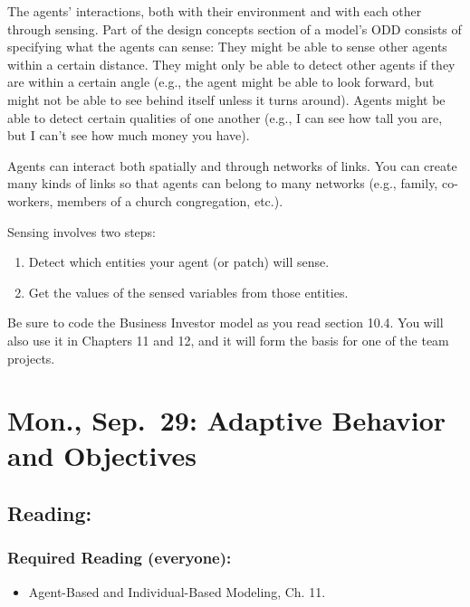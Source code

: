\documentclass[
]{article}
\providecommand{\tightlist}{%
  \setlength{\itemsep}{0pt}\setlength{\parskip}{0pt}}
\begin{document}
The agents' interactions, both with their environment and with each
other through sensing. Part of the design concepts section of a model's
ODD consists of specifying what the agents can sense: They might be able
to sense other agents within a certain distance. They might only be able
to detect other agents if they are within a certain angle (e.g., the
agent might be able to look forward, but might not be able to see behind
itself unless it turns around). Agents might be able to detect certain
qualities of one another (e.g., I can see how tall you are, but I can't
see how much money you have).

Agents can interact both spatially and through networks of links. You
can create many kinds of links so that agents can belong to many
networks (e.g., family, co-workers, members of a church congregation,
etc.).

Sensing involves two steps:

\begin{enumerate}
\def\labelenumi{\arabic{enumi}.}
\tightlist
\item
  Detect which entities your agent (or patch) will sense.
\item
  Get the values of the sensed variables from those entities.
\end{enumerate}

Be sure to code the Business Investor model as you read section 10.4.
You will also use it in Chapters 11 and 12, and it will form the basis
for one of the team projects.

\section{Mon., Sep.~29: Adaptive Behavior and
Objectives}\label{mon.-sep.-29-adaptive-behavior-and-objectives}

\subsection{Reading:}\label{reading-11}

\subsubsection{Required Reading
(everyone):}\label{required-reading-everyone-10}

\begin{itemize}
\tightlist
\item
  Agent-Based and Individual-Based Modeling, Ch. 11.
\end{itemize}
\end{document}

